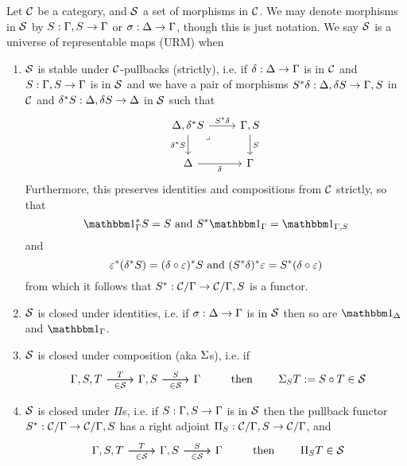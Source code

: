 \begin{dfn}
  Let $\mathcal{C}$ be a category, and $\mathcal{S}$ a set of morphisms in $\mathcal{C}$.
  We may denote morphisms in $\mathcal{S}$ by $S : \Gamma,S \to \Gamma$ or $\sigma : \Delta \to \Gamma$,
  though this is just notation.
  We say $\mathcal{S}$ is a universe of representable maps (URM) when
  \begin{enumerate}
    \item $\mathcal{S}$ is stable under $\mathcal{C}$-pullbacks (strictly),
          i.e. if $\delta : \Delta \to \Gamma$ is in $\mathcal{C}$ and $S : \Gamma,S \to \Gamma$ is in $\mathcal{S}$
          and we have a pair of morphisms $S^{*} \delta : \Delta,\delta S \to \Gamma,S$ in $\mathcal{C}$ and
          $\delta^* S : \Delta,\delta S \to \Delta$ in $\mathcal{S}$ such that
          \[\begin{tikzcd}
            {\De,\de^* S} & {\Ga,S} \\
            \De & \Ga
            \arrow["S", from=1-2, to=2-2]
            \arrow["{\de^* S}"', from=1-1, to=2-1]
            \arrow["\de"', from=2-1, to=2-2]
            \arrow["S^{*} \de", from=1-1, to=1-2]
            \arrow["\lrcorner"{anchor=center, pos=0.125}, draw=none, from=1-1, to=2-2]
          \end{tikzcd}\]
          Furthermore, this preserves identities and compositions from $\mathcal{C}$ strictly, so that
          \[ \id{\Ga}^{*} S = S \text{ and } S^{*} \id{\Ga} = \id{\Ga,S}\]
          and
          \[ \varepsilon^{*} (\delta^{*} S) = (\delta \circ \varepsilon)^{*} S \text{ and } (S^{*}\delta)^{*}\varepsilon = S^{*}(\delta \circ \varepsilon) \]
          from which it follows that
          $S^{*} : \mathcal{C} / \Gamma \to \mathcal{C} / \Gamma,S$ is a functor.
    \item $\mathcal{S}$ is closed under identities, i.e. if $\sigma : \Delta \to \Gamma$ is in $\mathcal{S}$ then
          so are $\id{\De}$ and $\id{\Ga}$.
    \item $\mathcal{S}$ is closed under composition (aka $\Sigma$s), i.e. if
          \[\begin{tikzcd}
              {\Ga,S,T} & {\Ga,S} & \Ga
              \arrow["T", from=1-1, to=1-2]
              \arrow["\in \SS"', from=1-1, to=1-2]
              \arrow["S", from=1-2, to=1-3]
              \arrow["\in \SS"', from=1-2, to=1-3]
            \end{tikzcd}
          \quad \quad \text{ then } \quad \quad \Si_{S} T := S \circ T \in \SS\]
    \item $\mathcal{S}$ is closed under $\Pi$s, i.e. if $S : \Gamma,S \to \Gamma$ is in $\mathcal{S}$
          then the pullback functor $S^{*} : \mathcal{C} / \Gamma \to \mathcal{C} / \Gamma,S$ has a right
          adjoint $\Pi_{S} : \mathcal{C} / \Gamma,S \to \mathcal{C} / \Gamma$, and
            \[\begin{tikzcd}
              {\Ga,S,T} & {\Ga,S} & \Ga
              \arrow["T", from=1-1, to=1-2]
              \arrow["\in \SS"', from=1-1, to=1-2]
              \arrow["S", from=1-2, to=1-3]
              \arrow["\in \SS"', from=1-2, to=1-3]
            \end{tikzcd}
          \quad \quad \text{ then } \quad \quad \Pi_{S} T \in \SS\]
  \end{enumerate}


\end{dfn}
